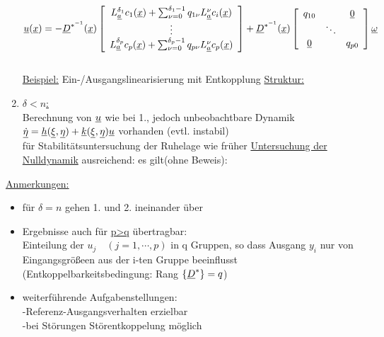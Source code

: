 \documentclass[openany,a4paper,11pt]{book}
\begin{document}
\begin{enumerate}
    \[\uline{u}(\uline{x})=-\uline{D}^{*^{-1}}(\uline{x})
    \left[ \begin{array}{c}      L_{\uline{a}}^{\delta_1}c_1(\uline{x})+\sum_{\nu=0}^{\delta_1-1}q_{1\nu}L_{\uline{a}}^{\nu}c_i(\uline{x})\\ \vdots\\ L_{\uline{a}}^{\delta_p}c_p(\uline{x})+\sum_{\nu=0}^{\delta_p-1}q_{p\nu}L_{\uline{a}}^{\nu}c_p(\uline{x})\\ \end{array} \right]+ \uline{D}^{*^{-1}}(\uline{x}) \left[ \begin{array}{ccc} 
    q_{10}& &\uline{0}\\ &\ddots &\\ \uline{0}& &q_{p0}\\ \end{array} \right]\uline{\omega}
    \]
    \\
    \uline{Beispiel:} Ein-/Ausgangslinearisierung mit Entkopplung \uline{Struktur:} 
    \item \uline{$\delta<n$:} \\
    Berechnung von $\uline{u}$ wie bei 1., jedoch unbeobachtbare Dynamik $\uline{\dot{\eta}}=\uline{h}(\uline{\xi},\uline{\eta})+\uline{k}(\uline{\xi},\uline{\eta})\uline{u}$ vorhanden (evtl. instabil)\\
    für Stabilitätsuntersuchung der Ruhelage wie früher \uline{Untersuchung der Nulldynamik} ausreichend: es gilt(ohne Beweis): \\
    \begin{minipage}[c]{\textwidth}
    \end{minipage}
\end{enumerate}
\uline{Anmerkungen:}\begin{itemize}
    \item für $\delta=n$ gehen 1. und 2. ineinander über
    \item Ergebnisse auch für \uline{p>q} übertragbar:\\
    Einteilung der $u_j \quad (j=1,\cdots,p)$ in q Gruppen, so dass Ausgang $y_i$ nur von Eingangsgrößeen aus der i-ten Gruppe beeinflusst (Entkoppelbarkeitsbedingung: Rang $\{\uline{D}^*\}=q$)
    \item weiterführende Aufgabenstellungen:\\
      -Referenz-Ausgangsverhalten erzielbar\\
      -bei Störungen Störentkoppelung möglich
\end{itemize}
\end{document}
